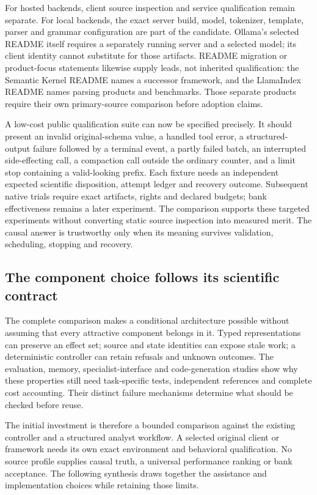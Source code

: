 For hosted backends, client source inspection and service qualification remain separate. For local
backends, the exact server build, model, tokenizer, template, parser and grammar configuration are
part of the candidate. Ollama's selected README itself requires a separately running server and a
selected model; its client identity cannot substitute for those artifacts. README migration or
product-focus statements likewise supply leads, not inherited qualification: the Semantic Kernel
README names a successor framework, and the LlamaIndex README names parsing products and benchmarks.
Those separate products require their own primary-source comparison before adoption claims.
\citep{exec28_dl_ollama,exec28_dl_semantic_kernel,exec28_dl_llama_index}

A low-cost public qualification suite can now be specified precisely. It should present an invalid
original-schema value, a handled tool error, a structured-output failure followed by a terminal event,
a partly failed batch, an interrupted side-effecting call, a compaction call outside the ordinary
counter, and a limit stop containing a valid-looking prefix. Each fixture needs an independent expected
scientific disposition, attempt ledger and recovery outcome. Subsequent native trials require exact
artifacts, rights and declared budgets; bank effectiveness remains a later experiment. The comparison
supports these targeted experiments without converting static source inspection into measured merit.
The causal answer is trustworthy only when its meaning survives validation, scheduling, stopping and recovery.

\subsection{The component choice follows its scientific contract}

The complete comparison makes a conditional architecture possible without
assuming that every attractive component belongs in it. Typed representations
can preserve an effect set; source and state identities can expose stale work;
a deterministic controller can retain refusals and unknown outcomes. The
evaluation, memory, specialist-interface and code-generation studies show why
these properties still need task-specific tests, independent references and
complete cost accounting. Their distinct failure mechanisms determine what
should be checked before reuse.

The initial investment is therefore a bounded comparison against the existing
controller and a structured analyst workflow. A selected original client or
framework needs its own exact environment and behavioral qualification. No
source profile supplies causal truth, a universal performance ranking or bank
acceptance. The following synthesis draws together the assistance and
implementation choices while retaining those limits.


